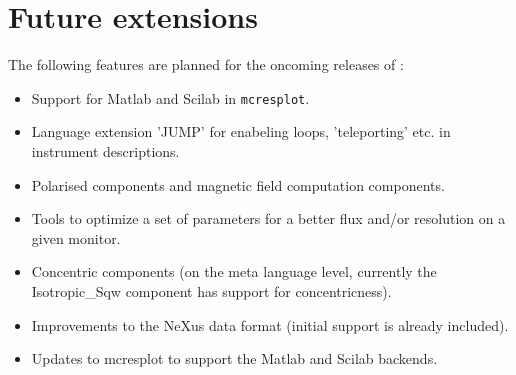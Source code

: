 \section{Future extensions}
\label{s:future}
The following features are planned for the oncoming releases of \MCS :
\begin{itemize}
\item Support for Matlab and Scilab in \verb+mcresplot+.
\item Language extension 'JUMP' for enabeling loops, 'teleporting'
  etc. in instrument descriptions.
\item Polarised components and magnetic field computation components.
\item Tools to optimize a set of parameters for a better flux and/or
  resolution on a given monitor.
\item Concentric components (on the meta language level, currently the
  Isotropic\_Sqw component has support for concentricness).
\item Improvements to the NeXus data format (initial support is
  already included).
\item Updates to mcresplot to support the Matlab and Scilab backends.
\end{itemize}









